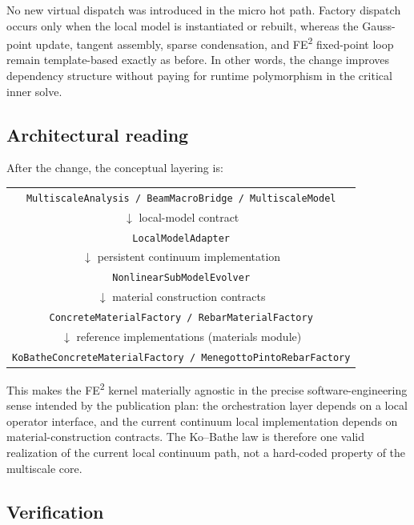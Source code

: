 No new virtual dispatch was introduced in the micro hot path.  Factory
dispatch occurs only when the local model is instantiated or rebuilt, whereas
the Gauss-point update, tangent assembly, sparse condensation, and FE\textsuperscript{2}
fixed-point loop remain template-based exactly as before.  In other words, the
change improves dependency structure without paying for runtime polymorphism in
the critical inner solve.

\subsection{Architectural reading}

After the change, the conceptual layering is:
\begin{center}
\begin{tabular}{c}
\texttt{MultiscaleAnalysis / BeamMacroBridge / MultiscaleModel} \\
\(\downarrow\) local-model contract \\
\texttt{LocalModelAdapter} \\
\(\downarrow\) persistent continuum implementation \\
\texttt{NonlinearSubModelEvolver} \\
\(\downarrow\) material construction contracts \\
\texttt{ConcreteMaterialFactory / RebarMaterialFactory} \\
\(\downarrow\) reference implementations (materials module) \\
\texttt{KoBatheConcreteMaterialFactory / MenegottoPintoRebarFactory}
\end{tabular}
\end{center}

This makes the FE\textsuperscript{2} kernel materially agnostic in the precise
software-engineering sense intended by the publication plan: the orchestration
layer depends on a local operator interface, and the current continuum local
implementation depends on material-construction contracts.  The Ko--Bathe law
is therefore one valid realization of the current local continuum path, not a
hard-coded property of the multiscale core.

\subsection{Verification}

